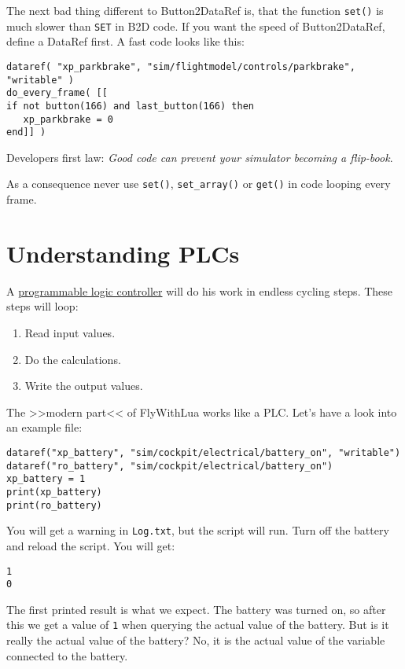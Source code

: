 \documentclass[11pt,parskip=half,a4paper]{scrartcl}
\begin{document}
The next bad thing different to Button2DataRef is, that the function \verb|set()| is much slower than \verb|SET| in B2D code. If you want the speed of Button2DataRef, define a DataRef first. A fast code looks like this:

\begin{lstlisting}
dataref( "xp_parkbrake", "sim/flightmodel/controls/parkbrake", "writable" )
do_every_frame( [[
if not button(166) and last_button(166) then
   xp_parkbrake = 0
end]] )
\end{lstlisting}

Developers first law: \emph{Good code can prevent your simulator becoming a flip-book}.

As a consequence never use \verb|set()|, \verb|set_array()| or \verb|get()| in code looping every frame.

\newpage
\section{Understanding PLCs}

A \href{http://en.wikipedia.org/wiki/Programmable_logic_controller}{programmable logic controller} will do his work in endless cycling steps. These steps will loop:

\begin{enumerate}
	\item Read input values.
	\item Do the calculations.
	\item Write the output values.
\end{enumerate}

The >>modern part<< of FlyWithLua works like a PLC. Let's have a look into an example file:

\begin{lstlisting}
dataref("xp_battery", "sim/cockpit/electrical/battery_on", "writable")
dataref("ro_battery", "sim/cockpit/electrical/battery_on")
xp_battery = 1
print(xp_battery)
print(ro_battery)
\end{lstlisting}

You will get a warning in \verb|Log.txt|, but the script will run. Turn off the battery and reload the script. You will get:

\verb|1|\\
\verb|0|

The first printed result is what we expect. The battery was turned on, so after this we get a value of \verb|1| when querying the actual value of the battery. But is it really the actual value of the battery? No, it is the actual value of the variable connected to the battery.
\end{document}
